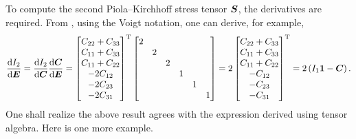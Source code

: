 To compute the second Piola--Kirchhoff stress tensor $\bm{S}$, the derivatives are required.
From , using the Voigt notation, one can derive, for example,
\begin{gather}
    \dfrac{\mathrm{d}I_2}{\mathrm{d}\bm{E}}=\dfrac{\mathrm{d}I_2}{\mathrm{d}\bm{C}}\dfrac{\mathrm{d}\bm{C}}{\mathrm{d}\bm{E}}=\begin{bmatrix}
        C_{22}+C_{33} \\
        C_{11}+C_{33} \\
        C_{11}+C_{22} \\
        -2C_{12}      \\
        -2C_{23}      \\
        -2C_{31}
    \end{bmatrix}^{\mathrm{T}}\begin{bmatrix}
        2 &   &   &   &   &   \\
          & 2 &   &   &   &   \\
          &   & 2 &   &   &   \\
          &   &   & 1 &   &   \\
          &   &   &   & 1 &   \\
          &   &   &   &   & 1
    \end{bmatrix}=2\begin{bmatrix}
        C_{22}+C_{33} \\
        C_{11}+C_{33} \\
        C_{11}+C_{22} \\
        -C_{12}       \\
        -C_{23}       \\
        -C_{31}
    \end{bmatrix}^{\mathrm{T}}=2\left(I_1\bm{1}-\bm{C}\right).
\end{gather}
One shall realize the above result agrees with the expression derived using tensor algebra.
Here is one more example.
